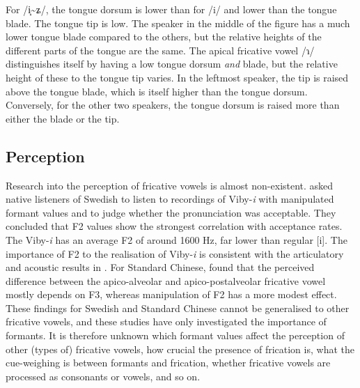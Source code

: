 \documentclass[output=paper,colorlinks,citecolor=brown,chinesefont]{langscibook}
\begin{document}
For /i̝{\textasciitilde}ʑ/, the tongue dorsum is lower than for /i/ and lower than the tongue blade. The tongue tip is low. The speaker in the middle of the figure has a much lower tongue blade compared to the others, but the relative heights of the different parts of the tongue are the same. The apical fricative vowel /ɿ/ distinguishes itself by having a low tongue dorsum \textit{and} blade, but the relative height of these to the tongue tip varies. In the leftmost speaker, the tip is raised above the tongue blade, which is itself higher than the tongue dorsum. Conversely, for the other two speakers, the tongue dorsum is raised more than either the blade or the tip.

\subsection{Perception}
Research into the perception of fricative vowels is almost non-existent. \citet{Björsten&Engstrand_1999} asked native listeners of Swedish to listen to recordings of Viby-\textit{i} with manipulated formant values and to judge whether the pronunciation was acceptable. They concluded that F2 values show the strongest correlation with acceptance rates. The Viby-\textit{i} has an average F2 of around 1600 Hz, far lower than regular [i]. The importance of F2 to the realisation of Viby-\textit{i} is consistent with the articulatory and acoustic results in \citet{westerberg_2020}. For Standard Chinese, \citet{Cheung_2003} found that the perceived difference between the apico-alveolar and apico-postalveolar fricative vowel mostly depends on F3, whereas manipulation of F2 has a more modest effect.  These findings for Swedish and Standard Chinese cannot be generalised to other fricative vowels, and these studies have only investigated the importance of formants. It is therefore unknown which formant values affect the perception of other (types of) fricative vowels, how crucial the presence of frication is, what the cue-weighing is between formants and frication, whether fricative vowels are processed as consonants or vowels, and so on.

\end{document}

